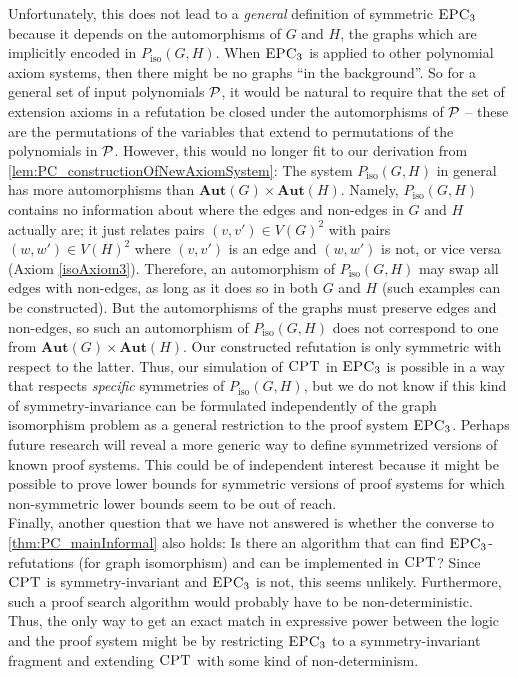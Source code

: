 \documentclass[a4paper,UKenglish,cleveref, autoref, thm-restate]{lipics-v2021}
\newcommand{\CPT}{\mbox{\sc CPT}}
\newcommand{\Aut}{\mathbf{Aut}}
\newcommand{\EPC}{\mbox{\sc EPC}}
\newcommand{\Pp}{{\cal P}}
\newcommand{\Piso}{P_{\text{iso}}}
\begin{document}
	Unfortunately, this does not lead to a \emph{general} definition of symmetric $\EPC_3$ because it depends on the automorphisms of $G$ and $H$, the graphs which are implicitly encoded in $\Piso(G,H)$. When $\EPC_3$ is applied to other polynomial axiom systems, then there might be no graphs ``in the background''. So for a general set of input polynomials $\Pp$, it would be natural to require that the set of extension axioms in a refutation be closed under the automorphisms of $\Pp$ -- these are the permutations of the variables that extend to permutations of the polynomials in $\Pp$. However, this would no longer fit to our derivation from \autoref{lem:PC_constructionOfNewAxiomSystem}: The system $\Piso(G,H)$ in general has more automorphisms than $\Aut(G) \times \Aut(H)$. Namely, $\Piso(G,H)$ contains no information about where the edges and non-edges in $G$ and $H$ actually are; it just relates pairs $(v,v') \in V(G)^2$ with pairs $(w,w') \in V(H)^2$ where $(v,v')$ is an edge and $(w,w')$ is not, or vice versa (Axiom \eqref{isoAxiom3}). Therefore, an automorphism of $\Piso(G,H)$ may swap all edges with non-edges, as long as it does so in both $G$ and $H$ (such examples can be constructed). But the automorphisms of the graphs must preserve edges and non-edges, so such an automorphism of $\Piso(G,H)$ does not correspond to one from $\Aut(G) \times \Aut(H)$. Our constructed refutation is only symmetric with respect to the latter. Thus, our simulation of $\CPT$ in $\EPC_3$ is possible in a way that respects \emph{specific} symmetries of $\Piso(G,H)$, but we do not know if this kind of symmetry-invariance can be formulated independently of the graph isomorphism problem as a general restriction to the proof system $\EPC_3$. Perhaps future research will reveal a more generic way to define symmetrized versions of known proof systems. This could be of independent interest because it might be possible to prove lower bounds for symmetric versions of proof systems for which non-symmetric lower bounds seem to be out of reach.\\
	
	Finally, another question that we have not answered is whether the converse to \autoref{thm:PC_mainInformal} also holds: Is there an algorithm that can find $\EPC_3$-refutations (for graph isomorphism) and can be implemented in $\CPT$? Since $\CPT$ is symmetry-invariant and $\EPC_3$ is not, this seems unlikely. Furthermore, such a proof search algorithm would probably have to be non-deterministic. Thus, the only way to get an exact match in expressive power between the logic and the proof system might be by restricting $\EPC_3$ to a symmetry-invariant fragment and extending $\CPT$ with some kind of non-determinism.
	
\end{document}

